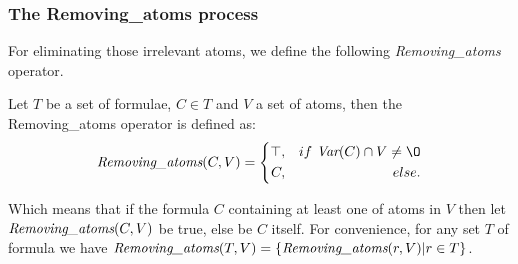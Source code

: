 \documentclass{article}
\begin{document}
\subsubsection{The Removing\_atoms process}
For eliminating those irrelevant atoms, we define the following \emph{Removing\_atoms} operator.
\begin{definition}\label{def:Elm}
Let $T$ be a set of formulae, $C \in T$ and $V$ a set of atoms, then the Removing\_atoms operator is defined as:
$$ \emph{Removing\_atoms}(C, V)=\left\{
\begin{aligned}
\top, && if\ \Var(C) \cap V \neq {\O} \\
C, && else.
\end{aligned}
\right.
$$
\end{definition}
Which means that if the formula $C$ containing at least one of atoms in $V$ then let $\emph{Removing\_atoms}(C, V)$ be true, else be $C$ itself.
For convenience, for any set $T$ of formula we have $\emph{Removing\_atoms}(T, V) = \{\emph{Removing\_atoms}(r, V) | r \in T\}$.
\end{document}
